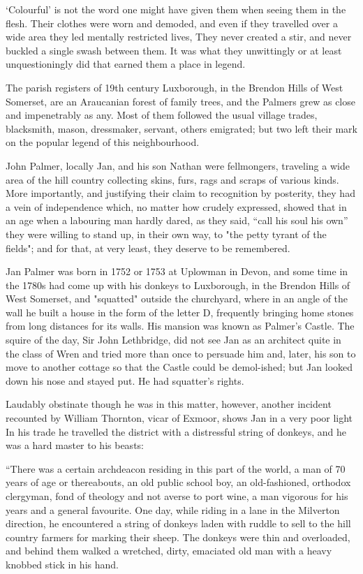 
‘Colourful’ is not the word one might have given them when seeing them in the flesh. Their clothes were worn and demoded, and even if they travelled over a wide area they led mentally restricted lives, They never created a stir, and never buckled a single swash between them. It was what they unwittingly or at least unquestioningly did that earned them a place in legend.

The parish registers of 19th century Luxborough, in the Brendon Hills of West Somerset, are an Araucanian forest of family trees, and the Palmers grew as close and impenetrably as any. Most of them followed the usual village trades, blacksmith, mason, dressmaker, servant, others emigrated; but two left their mark on the popular legend of this neighbourhood.

John Palmer, locally Jan, and his son Nathan were fellmongers, traveling a wide area of the hill country collecting skins, furs, rags and scraps of various kinds. More importantly, and justifying their claim to recognition by posterity, they had a vein of independence which, no matter how crudely expressed, showed that in an age when a labouring man hardly dared, as they said, “call his soul his own” they were willing to stand up, in their own way, to "the petty tyrant of the fields"; and for that, at very least, they deserve to be remembered. 

Jan Palmer was born in 1752 or 1753 at Uplowman in Devon, and some time in the 1780s had come up with his donkeys to Luxborough, in the Brendon Hills of West Somerset, and "squatted" outside the churchyard, where in an angle of the wall he built a house in the form of the letter D, frequently bringing home stones from long distances for its walls. His mansion was known as Palmer's Castle. The squire of the day, Sir John Lethbridge, did not see Jan as an architect quite in the class of Wren and tried more than once to persuade him and, later, his son to move to another cottage so that the Castle could be demol-ished; but Jan looked down his nose and stayed put. He had squatter's rights.

Laudably obstinate though he was in this matter, however, another incident recounted by William Thornton, vicar of Exmoor, shows Jan in a very poor light In his trade he travelled the district with a distressful string of donkeys, and he was a hard master to his beasts: 

“There was a certain archdeacon residing in this part of the world, a man of 70 years of age or thereabouts, an old public school boy, an old-fashioned, orthodox clergyman, fond of theology and not averse to port wine, a man vigorous for his years and a general favourite. One day, while riding in a lane in the Milverton direction, he encountered a string of donkeys laden with ruddle to sell to the hill country farmers for marking their sheep. The donkeys were thin and overloaded, and behind them walked a wretched, dirty, emaciated old man with a heavy knobbed stick in his hand.

